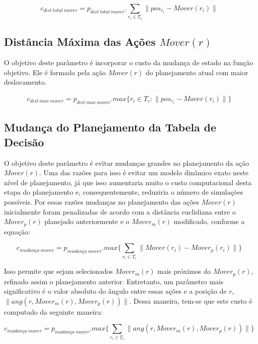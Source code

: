 \begin{dmath} 
 c_{dist{\ }total{\ }mover} = p_{dist{\ }total{\ }mover} . 
 \sum_{r_i \in T_c} \lVert pos_{r_i} - Mover(r_i)\rVert
\end{dmath} 

\subsection{Distância Máxima das Ações $Mover(r)$} 
O objetivo deste parâmetro é incorporar o custo da
mudança de estado na função objetivo. Ele é formado pela
ação $Mover(r)$ do planejamento atual com maior deslocamento.

\begin{gather} 
 c_{dist{\ }max{\ }mover}= p_{dist{\ }max{\ }mover} . 
 max \lbrace r_i \in T_c : \lVert pos_{r_i} - Mover(r_i)\rVert \rbrace
\end{gather} 

\subsection{Mudança do Planejamento da Tabela de Decisão}\label{subsec:change_cost}
O objetivo deste parâmetro é evitar mudanças grandes no
planejamento da ação $Mover(r)$. Uma das razões para isso é evitar um modelo dinâmico
exato neste nível de planejamento, já que isso aumentaria muito o custo
computacional desta etapa do planejamento e, consequentemente, reduziria
o número de simulações possíveis. Por essas razões mudanças no planejamento
das ações $Mover(r)$ inicialmente foram penalizadas de acordo com a distância euclidiana
entre o $Mover_p(r)$ planejado anteriormente e o $Mover_{m}(r)$ modificado, conforme
a equação:

\begin{dmath} 
 c_{mudança{\ }mover} = p_{mudança{\ }mover} . 
 max \lbrace \sum_{r_i \in T_c} \lVert Mover(r_i) - Mover_p(r_i)\rVert \rbrace
\end{dmath} 

Isso permite que sejam selecionados $Mover_{m}(r)$ mais próximos do
$Mover_p(r)$, refinado assim o planejamento anterior. Entretanto,
um parâmetro mais significativo é o valor absoluto do ângulo entre
essas ações e a posição de $r$, $\lVert ang(r, Mover_{m}(r), Mover_p(r)) \rVert$.
Dessa maneira, tem-se que este custo é computado da seguinte maneira:

\begin{dmath} 
 c_{mudança{\ }mover} = p_{mudança{\ }mover} . 
 max \lbrace \sum_{r_i \in T_c} \lVert ang(r, Mover_{m}(r), Mover_p(r)) \rVert \rbrace
\end{dmath} 

